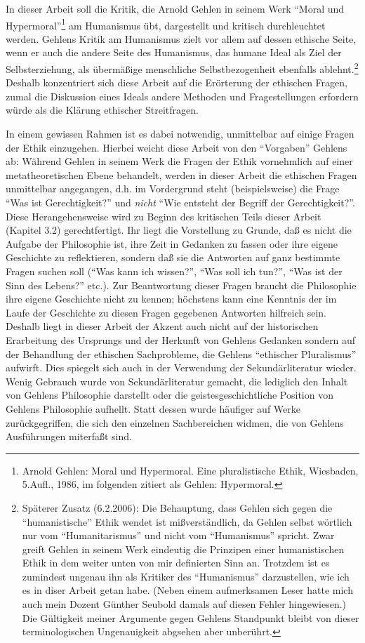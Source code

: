 \documentclass[12pt,a4paper]{article}
\begin{document}
In dieser Arbeit soll die Kritik, die Arnold Gehlen in seinem Werk
"`Moral und Hypermoral"'\footnote{Arnold Gehlen: Moral und Hypermoral.
  Eine pluralistische Ethik, Wiesbaden, 5.Aufl., 1986, im folgenden
  zitiert als Gehlen: Hypermoral.} am Humanismus übt, dargestellt und
kritisch durchleuchtet werden. Gehlens Kritik am Humanismus zielt vor
allem auf dessen ethische Seite, wenn er auch die andere Seite des
Humanismus, das humane Ideal als Ziel der Selbsterziehung, als
übermäßige menschliche Selbstbezogenheit ebenfalls
ablehnt.\footnote{Späterer Zusatz (6.2.2006): Die Behauptung, dass
  Gehlen sich gegen die "`humanistische"' Ethik wendet ist
  mißverständlich, da Gehlen selbst wörtlich nur vom
  "`Humanitarismus"' und nicht vom "`Humanismus"' spricht. Zwar greift
  Gehlen in seinem Werk eindeutig die Prinzipen einer humanistischen
  Ethik in dem weiter unten von mir definierten Sinn an. Trotzdem ist
  es zumindest ungenau ihn als Kritiker des "`Humanismus"'
  darzustellen, wie ich es in diser Arbeit getan habe. (Neben einem
  aufmerksamen Leser hatte mich auch mein
  Dozent Günther Seubold damals auf diesen Fehler hingewiesen.) Die
  Gültigkeit meiner Argumente gegen Gehlens Standpunkt bleibt von
  dieser terminologischen Ungenauigkeit abgsehen aber unberührt.}
Deshalb konzentriert sich diese Arbeit auf die Erörterung der
ethischen Fragen, zumal die Diskussion eines Ideals andere Methoden
und Fragestellungen erfordern würde als die Klärung ethischer
Streitfragen.

In einem gewissen Rahmen ist es dabei notwendig, unmittelbar auf einige
Fragen der Ethik einzugehen. Hierbei weicht diese Arbeit von den
"`Vorgaben"' Gehlens ab: Während Gehlen in seinem Werk die Fragen der
Ethik vornehmlich auf einer metatheoretischen Ebene behandelt, werden in
dieser Arbeit die ethischen Fragen unmittelbar angegangen, d.h. im
Vordergrund steht (beispielsweise) die Frage "`Was ist Gerechtigkeit?"'
und {\em nicht} "`Wie entsteht der Begriff der Gerechtigkeit?"'. Diese
Herangehensweise wird zu Beginn des kritischen Teils dieser Arbeit
(Kapitel 3.2) gerechtfertigt.  Ihr liegt die Vorstellung zu Grunde, daß
es nicht die Aufgabe der Philosophie ist, ihre Zeit in Gedanken zu
fassen oder ihre eigene Geschichte zu reflektieren, sondern daß sie die
Antworten auf ganz bestimmte Fragen suchen soll ("`Was kann ich
wissen?"', "`Was soll ich tun?"', "`Was ist der Sinn des Lebens?"'
etc.). Zur Beantwortung dieser Fragen braucht die Philosophie ihre
eigene Geschichte nicht zu kennen; höchstens kann eine Kenntnis der im
Laufe der Geschichte zu diesen Fragen gegebenen Antworten hilfreich
sein.  Deshalb liegt in dieser Arbeit der Akzent auch nicht auf der
historischen Erarbeitung des Ursprungs und der Herkunft von Gehlens
Gedanken sondern auf der Behandlung der ethischen Sachprobleme, die
Gehlens "`ethischer Pluralismus"' aufwirft. Dies spiegelt sich auch in
der Verwendung der Sekundärliteratur wieder. Wenig Gebrauch wurde von
Sekundärliteratur gemacht, die lediglich den Inhalt von Gehlens
Philosophie darstellt oder die geistesgeschichtliche Position von
Gehlens Philosophie aufhellt. Statt dessen wurde häufiger auf Werke
zurückgegriffen, die sich den einzelnen Sachbereichen widmen, die von
Gehlens Ausführungen miterfaßt sind.
\end{document}
